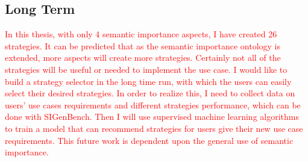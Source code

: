 \subsection{Long Term}
\textcolor{red}{
In this thesis, with only 4 semantic importance aspects, I have created 26 strategies.
It can be predicted that as the semantic importance ontology is extended, more aspects will create more strategies. 
Certainly not all of the strategies will be useful or needed to implement the use case. 
I would like to build a strategy selector in the long time run, with which the users can easily select their desired strategies. 
In order to realize this, I need to collect data on users' use cases requirements and different strategies performance, which can be done with SIGenBench.
Then I will use supervised machine learning algorithms to train a model that can recommend strategies for users give their new use case requirements. 
This future work is dependent upon the general use of semantic importance. 
}


